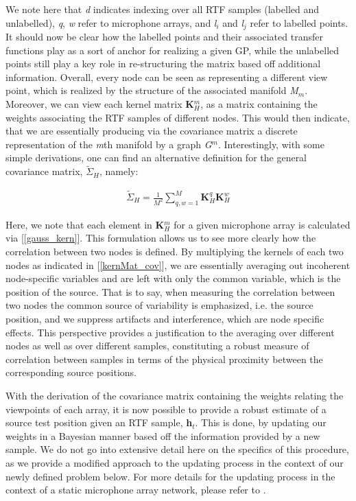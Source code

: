 \documentclass{article}
\begin{document}
We note here that \textit{d} indicates indexing over all RTF samples (labelled and unlabelled), \textit{q}, \textit{w} refer to microphone arrays, and \textit{l$_i$} and \textit{l$_j$} refer to labelled points. It should now be clear how the labelled points and their associated transfer functions play as a sort of anchor for realizing a given GP, while the unlabelled points still play a key role in re-structuring the matrix based off additional information. Overall, every node can be seen as representing a different view point, which is realized by the structure of the associated manifold \textit{M$_m$}. Moreover, we can view each kernel matrix \textbf{K$^\textit{m}_\textit{H}$}, as a matrix containing the weights associating the RTF samples of different nodes. This would then indicate, that we are essentially producing via the covariance matrix a discrete representation of the \textit{m}th manifold by a graph \textit{G$^m$}. Interestingly, with some simple derivations, one can find an alternative definition for the general covariance matrix, \textbf{$\tilde{\Sigma}$}$_H$, namely:

\begin{equation} \label{kernMat_cov}
    \begin{aligned}
        \textit{$\tilde{\Sigma}$}_\textit{H} = \frac{1}{\textit{M}^2} \sum_{q,w=1}^{M} \textbf{K}^q_\textit{H}\textbf{K}^w_\textit{H}
    \end{aligned}
\end{equation}

Here, we note that each element in \textbf{K}$^m_H$ for a given microphone array is calculated via [\ref{gauss_kern}]. This formulation allows us to see more clearly how the correlation between two nodes is defined. By multiplying the kernels of each two nodes as indicated in [\ref{kernMat_cov}], we are essentially averaging out incoherent node-speciﬁc variables and are left with only the common variable, which is the position of the source. That is to say, when measuring the correlation between two nodes the common source of variability is emphasized, i.e. the source position, and we suppress artifacts and interference, which are node specific effects. This perspective provides a justiﬁcation to the averaging over different nodes as well as over different samples, constituting a robust measure of correlation between samples in terms of the physical proximity between the corresponding source positions. 

With the derivation of the covariance matrix containing the weights relating the viewpoints of each array, it is now possible to provide a robust estimate of a source test position given an RTF sample, \textbf{h}$_\textit{t}$. This is done, by updating our weights in a Bayesian manner based off the information provided by a new sample. We do not go into extensive detail here on the specifics of this procedure, as we provide a modified approach to the updating process in the context of our newly defined problem below. For more details for the updating process in the context of a static microphone array network, please refer to \cite{LG_semisupervisedSourceLocalization}. 
\end{document}
